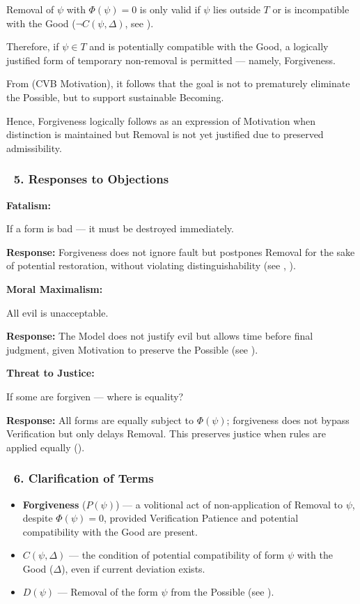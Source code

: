 \documentclass[12pt]{article}
\begin{document}
Removal of $\psi$ with $\Phi(\psi) = 0$ is only valid if $\psi$ lies outside $T$ or is incompatible with the Good ($\neg C(\psi, \Delta)$, see \text{[11.3]}).

Therefore, if $\psi \in T$ and is potentially compatible with the Good, a logically justified form of temporary non-removal is permitted — namely, Forgiveness.

From \text{[12.3]} (CVB Motivation), it follows that the goal is not to prematurely eliminate the Possible, but to support sustainable Becoming.

Hence, Forgiveness logically follows as an expression of Motivation when distinction is maintained but Removal is not yet justified due to preserved admissibility.

\subsubsection*{🔹 5. Responses to Objections}

\textbf{Fatalism:}

If a form is bad — it must be destroyed immediately.

\textbf{Response:} Forgiveness does not ignore fault but postpones Removal for the sake of potential restoration, without violating distinguishability (see \text{[5]}, \text{[9.1]}).

\bigskip

\textbf{Moral Maximalism:}

All evil is unacceptable.

\textbf{Response:} The Model does not justify evil but allows time before final judgment, given Motivation to preserve the Possible (see \text{[12.3]}).

\bigskip

\textbf{Threat to Justice:}

If some are forgiven — where is equality?

\textbf{Response:} All forms are equally subject to $\Phi(\psi)$; forgiveness does not bypass Verification but only delays Removal. This preserves justice when rules are applied equally (\text{[11.7]}).

\subsubsection*{🔹 6. Clarification of Terms}

\begin{itemize}
\item \textbf{Forgiveness} ($P(\psi)$) — a volitional act of non-application of Removal to $\psi$, despite $\Phi(\psi) = 0$, provided Verification Patience and potential compatibility with the Good are present.
\item $C(\psi, \Delta)$ — the condition of potential compatibility of form $\psi$ with the Good ($\Delta$), even if current deviation exists.
\item $D(\psi)$ — Removal of the form $\psi$ from the Possible (see \text{[15.6]}).
\end{itemize}
\end{document}
